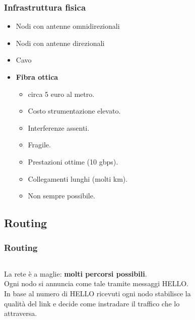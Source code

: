 \documentclass{beamer}
\begin{document}
\begin{frame}\frametitle{Infrastruttura fisica}
\begin{itemize}
 \item Nodi con antenne omnidirezionali
 \item Nodi con antenne direzionali
 \item Cavo
 \item \textbf{\color{blue}Fibra ottica}
\begin{itemize}
 \item circa 5 euro al metro.
 \item Costo strumentazione elevato.
 \item Interferenze assenti.
 \item Fragile.
 \item Prestazioni ottime (10 gbps).
 \item Collegamenti lunghi (molti km).
 \item Non sempre possibile.
\end{itemize}
\end{itemize}
\end{frame}


\subsection{Routing}
\begin{frame}\frametitle{Routing}
\begin{columns}
La rete è a maglie: \textbf{\color{blue} molti percorsi possibili}.\\\pause
Ogni nodo si annuncia come tale tramite messaggi HELLO.\\
In base al numero di HELLO ricevuti ogni nodo stabilisce la qualità del link e decide come instradare il traffico che lo attraversa.
\begin{figure}{}\end{figure}
 
\end{columns}

\end{frame}
\end{document}
